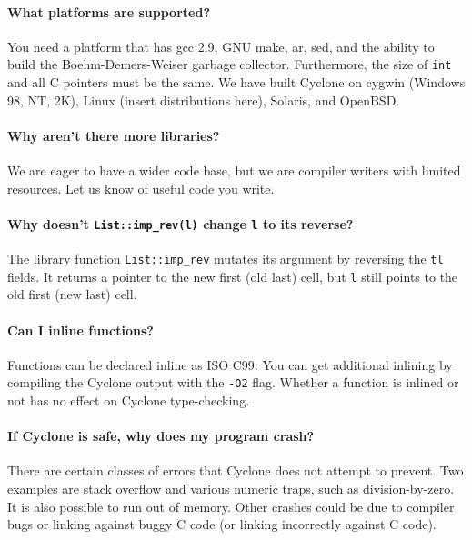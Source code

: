 \paragraph{What platforms are supported?}

You need a platform that has gcc 2.9, GNU make, ar, sed, and the
ability to build the Boehm-Demers-Weiser garbage collector.
Furthermore, the size of \texttt{int} and all C pointers must be the
same.  We have built Cyclone on cygwin (Windows 98, NT, 2K), Linux
(insert distributions here), Solaris, and OpenBSD.

\paragraph{Why aren't there more libraries?}

We are eager to have a wider code base, but we are compiler writers
with limited resources.  Let us know of useful code you write.

\paragraph{Why doesn't \texttt{List::imp_rev(l)} change \texttt{l} to
  its reverse?} 

The library function \texttt{List::imp_rev} mutates its argument by
reversing the \texttt{tl} fields.  It returns a pointer to the new
first (old last) cell, but \texttt{l} still points to the old first
(new last) cell.

\paragraph{Can I inline functions?}

Functions can be declared inline as ISO C99.  You can get additional
inlining by compiling the Cyclone output with the \texttt{-O2} flag.
Whether a function is inlined or not has no effect on Cyclone
type-checking.

\paragraph{If Cyclone is safe, why does my program crash?}

There are certain classes of errors that Cyclone does not attempt to
prevent.  Two examples are stack overflow and various numeric traps,
such as division-by-zero.  It is also possible to run out of memory.
Other crashes could be due to compiler bugs or linking against buggy C
code (or linking incorrectly against C code).

